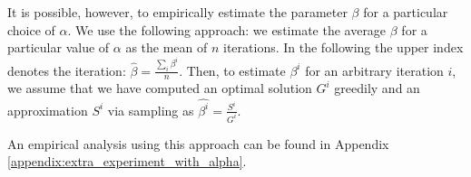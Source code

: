 It is possible, however, to empirically estimate the parameter $\beta$ for a particular choice of $\alpha$. We use the following approach: we estimate the average $\beta$ for a particular value of $\alpha$ as the mean of $n$ iterations. In the following the upper index denotes the iteration: $ \hat{\beta} = \frac{\sum_{i} \beta^i}{n} $. Then, to estimate $\beta^i$ for an arbitrary iteration $i$, we assume that we have computed an optimal solution $G^i$ greedily and an approximation $S^i$ via sampling as $\hat{\beta^i} = \frac{S^i}{G^i}$.

An empirical analysis using this approach can be found in Appendix \ref{appendix:extra_experiment_with_alpha}.
